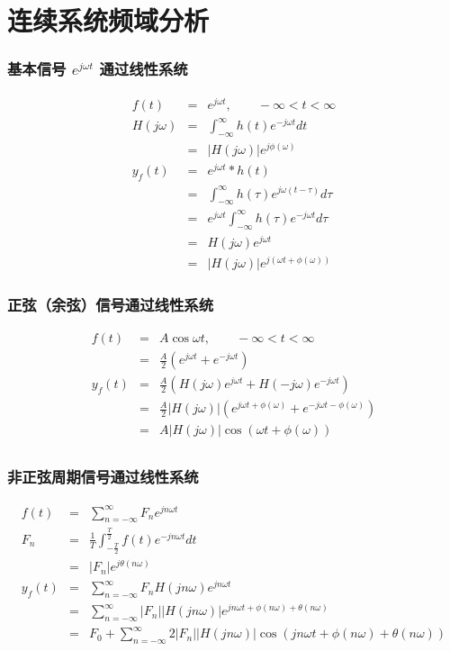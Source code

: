 \documentclass{beamer}
\begin{document}
\section{连续系统频域分析}
\label{sec-6}
\begin{frame}
\frametitle{基本信号 $e^{j\omega t}$ 通过线性系统}
\label{sec-6-1}

\begin{eqnarray*}
f(t) & =& e^{j\omega t},\qquad -\infty < t < \infty \\
H(j\omega) &=& \int_{-\infty}^{\infty}h(t)e^{-j\omega t}dt \\
           &=& |H(j\omega)|e^{j\phi(\omega)} \\
y_f(t) &=& e^{j\omega t}*h(t) \\
       &=& \int_{-\infty}^{\infty}h(\tau)e^{j\omega(t-\tau)}d\tau \\
       &=& e^{j\omega t}\int_{-\infty}^{\infty}h(\tau)e^{-j\omega t}d\tau \\
       &=& H(j\omega)e^{j\omega t} \\
       &=& |H(j\omega)|e^{j(\omega t+\phi(\omega))}
\end{eqnarray*}
\end{frame}
\begin{frame}
\frametitle{正弦（余弦）信号通过线性系统}
\label{sec-6-2}

\begin{eqnarray*}
f(t) & =& A\cos\omega t , \qquad  -\infty<t<\infty \\
     &=&\frac{A}{2}(e^{j\omega t}+e^{-j\omega t}) \\
y_f(t) &=& \frac{A}{2}(H(j\omega)e^{j\omega t}+H(-j\omega)e^{-j\omega t}) \\
       &=& \frac{A}{2}|H(j\omega)|(e^{j\omega t+\phi(\omega)}+e^{-j\omega t-\phi(\omega)}) \\
       &=& A|H(j\omega)|\cos(\omega t+\phi(\omega)) \\
\end{eqnarray*}
\end{frame}
\begin{frame}
\frametitle{非正弦周期信号通过线性系统}
\label{sec-6-3}

\begin{eqnarray*}
f(t) &=& \sum_{n=-\infty}^{\infty}F_n e^{jn\omega t} \\
F_n &=& \frac{1}{T}\int_{-\frac{T}{2}}^{\frac{T}{2}}f(t)e^{-jn\omega t}dt \\
    &=& |F_n|e^{j\theta(n\omega)} \\
y_f(t) &=& \sum_{n=-\infty}^{\infty}F_nH(jn\omega)e^{jn\omega t} \\
       &=& \sum_{n=-\infty}^{\infty}|F_n||H(jn\omega)|e^{jn\omega t+\phi(n\omega)+\theta(n\omega)} \\
       &=& F_0+ \sum_{n=-\infty}^{\infty}2|F_n||H(jn\omega)|\cos(jn\omega t+\phi(n\omega)+\theta(n\omega))
\end{eqnarray*}
\end{frame}
\end{document}
